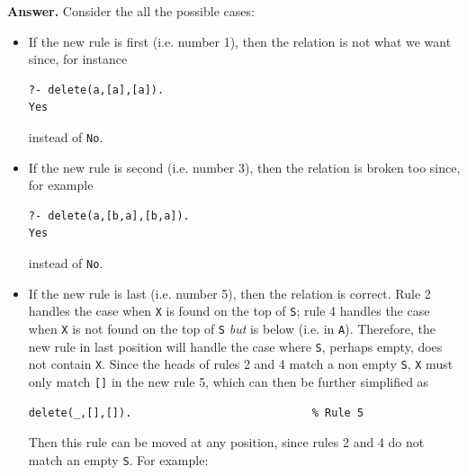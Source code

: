 
\noindent \textbf{Answer.} Consider the all the possible cases:
\begin{itemize}

  \item If the new rule is first (i.e. number 1), then the relation is
    not what we want since, for instance
{\small
\begin{verbatim}
?- delete(a,[a],[a]).
Yes
\end{verbatim}
}
\noindent instead of \texttt{No}.

  \item If the new rule is second (i.e. number 3), then the relation
    is broken too since, for example
{\small
\begin{verbatim}
?- delete(a,[b,a],[b,a]).
Yes
\end{verbatim}
}
\noindent instead of \texttt{No}.

  \item If the new rule is last (i.e. number 5), then the relation is
    correct. Rule 2 handles the case when \texttt{X} is found on the
    top of \texttt{S}; rule 4 handles the case when \texttt{X} is not
    found on the top of \texttt{S} \emph{but} is below (i.e. in
    \texttt{A}). Therefore, the new rule in last position will handle
    the case where \texttt{S}, perhaps empty, does not contain
    \texttt{X}. Since the heads of rules 2 and 4 match a non empty
    \texttt{S}, \texttt{X} must only match \verb|[]| in the new rule
    5, which can then be further simplified as
{\small
\begin{verbatim}
delete(_,[],[]).                            % Rule 5
\end{verbatim}
}
\noindent Then this rule can be moved at any position, since rules 2
and 4 do not match an empty \texttt{S}. For example:
{\small}

\end{itemize}

